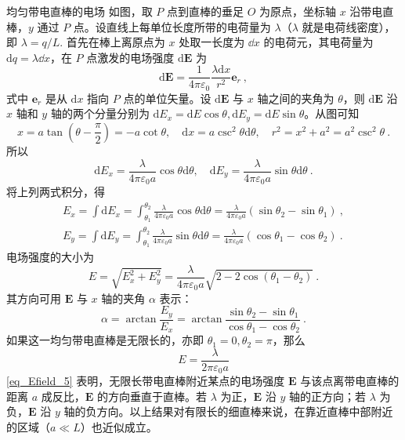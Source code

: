 \begin{example}{均匀带电直棒的电场}
如图，取 $P$ 点到直棒的垂足 $O$ 为原点，坐标轴 $x$ 沿带电直棒，$y$ 通过 $P$ 点。设直线上每单位长度所带的电荷量为 $\lambda$（$\lambda$ 就是电荷线密度），即 $\lambda=q/L$. 首先在棒上离原点为 $x$ 处取一长度为 $\dd{x}$ 的电荷元，其电荷量为 $\mathrm dq=\lambda\dd{x}$，在 $P$ 点激发的电场强度 $\mathrm d\mathbf E$ 为
\begin{equation}
\mathrm{d} \mathbf{E}=\frac{1}{4 \pi \varepsilon_{0}} \frac{\lambda \mathrm{d} x}{r^{2}} \mathbf e_r~,
\end{equation}
式中 $\mathbf e_r$ 是从 $\mathrm dx$ 指向 $P$ 点的单位矢量。设 $\mathrm{d} \mathbf{E}$ 与 $x$ 轴之间的夹角为 $\theta$，则 $\mathrm{d} \mathbf{E}$ 沿 $x$ 轴和 $y$ 轴的两个分量分别为 $\mathrm{d} E_{x}=\mathrm{d} E \cos \theta, \mathrm{d} E_{y}=\mathrm{d} E \sin \theta$。从图可知
\begin{equation}
x=a \tan \left(\theta-\frac{\pi}{2}\right)=-a \cot \theta, \quad \mathrm{d} x=a \csc ^{2} \theta \mathrm{d} \theta, \quad r^{2}=x^{2}+a^{2}=a^{2} \csc ^{2} \theta~.
\end{equation}
所以
\begin{equation}
\mathrm{d} E_{x}=\frac{\lambda}{4 \pi \varepsilon_{0} a} \cos \theta \mathrm{d} \theta, \quad \mathrm{d} E_{y}=\frac{\lambda}{4 \pi \varepsilon_{0} a} \sin \theta \mathrm{d} \theta~.
\end{equation}
将上列两式积分，得
\begin{equation}
\begin{aligned}E_{x}=\int \mathrm{d} E_{x}=\int_{\theta_{1}}^{\theta_{2}} \frac{\lambda}{4 \pi \varepsilon_{0} a} \cos \theta \mathrm{d} \theta=\frac{\lambda}{4 \pi \varepsilon_{0} a}\left(\sin \theta_{2}-\sin \theta_{1}\right) ~,\\ E_{y}=\int \mathrm{d} E_{y}=\int_{\theta_{1}}^{\theta_{2}} \frac{\lambda}{4 \pi \varepsilon_{0} a} \sin \theta \mathrm{d} \theta=\frac{\lambda}{4 \pi \varepsilon_{0} a}\left(\cos \theta_{1}-\cos \theta_{2}\right)~.\end{aligned}
\end{equation}
电场强度的大小为
\begin{equation}
E=\sqrt{E_{x}^{2}+E_{y}^{2}}=\frac{\lambda}{4 \pi \varepsilon_{0} a} \sqrt{2-2 \cos \left(\theta_{1}-\theta_{2}\right)}~.
\end{equation}
其方向可用 $\mathbf E$ 与 $x$ 轴的夹角 $\alpha$ 表示：
\begin{equation}
\alpha=\arctan \frac{E_{y}}{E_{x}}=\arctan \frac{\sin \theta_{2}-\sin \theta_{1}}{\cos \theta_{1}-\cos \theta_{2}}~.
\end{equation}
如果这一均匀带电直棒是无限长的，亦即 $\theta_{1}=0, \theta_{2}=\pi$，那么
\begin{equation} \label{eq_Efield_5}
E=\frac{\lambda}{2 \pi \varepsilon_{0} a}
\end{equation}
\autoref{eq_Efield_5} 表明，无限长带电直棒附近某点的电场强度 $\mathbf E$ 与该点离带电直棒的距离 $a$ 成反比，$\mathbf  E$ 的方向垂直于直棒。若 $\lambda$ 为正，$\mathbf E$ 沿 $y$ 轴的正方向；若 $\lambda$ 为负，$\mathbf E$ 沿 $y$ 轴的负方向。以上结果对有限长的细直棒来说，在靠近直棒中部附近的区域（$a\ll L$）也近似成立。
\end{example}



